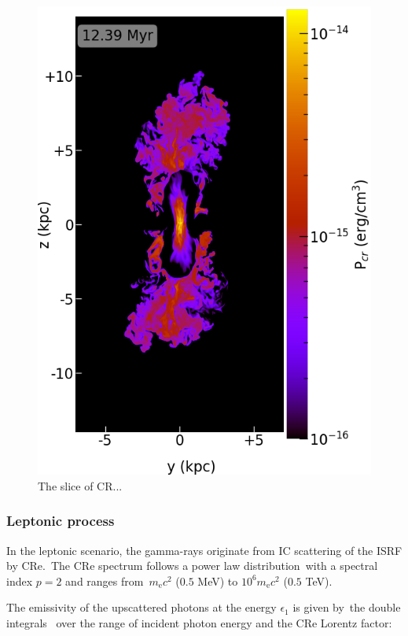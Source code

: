 \documentclass[twocolumn]{aastex631}
\begin{document}
  \begin{figure}
    \includegraphics[width=\columnwidth]{figures/fig__jetI5+ismSeed3-45deg-CR.png}
    \caption{The slice of CR...}
    \label{fig__jetI5+ismSeed3-45deg-CR}
  \end{figure}

\subsubsection{Leptonic process}
In the leptonic scenario, the gamma-rays originate from IC scattering of the ISRF by CRe.\
The CRe spectrum follows a power law distribution\
with a spectral index $p=2$ and ranges from\
$m_{\text{e}}c^2$ ($0.5$ MeV) to $10^{6}m_{\text{e}}c^2$ ($0.5$ TeV).\


The emissivity of the upscattered photons at the energy $\epsilon_{1}$ is given by\
the double integrals \citep{BLUMENTHAL1970}\
over the range of incident photon energy and the CRe Lorentz factor:
\end{document}

